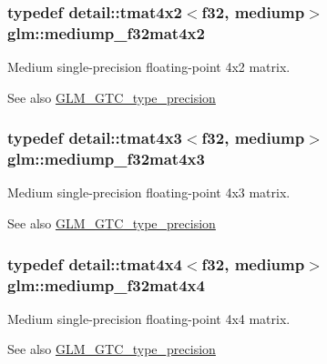 \subsubsection[{\texorpdfstring{mediump\+\_\+f32mat4x2}{mediump_f32mat4x2}}]{\setlength{\rightskip}{0pt plus 5cm}typedef detail\+::tmat4x2$<$f32, mediump$>$ {\bf glm\+::mediump\+\_\+f32mat4x2}}\hypertarget{group__gtc__type__precision_ga3400d5463f0a58cf3959406aa2b69f72}{}\label{group__gtc__type__precision_ga3400d5463f0a58cf3959406aa2b69f72}
Medium single-\/precision floating-\/point 4x2 matrix. \begin{DoxySeeAlso}{See also}
\hyperlink{group__gtc__type__precision}{G\+L\+M\+\_\+\+G\+T\+C\+\_\+type\+\_\+precision} 
\end{DoxySeeAlso}
\subsubsection[{\texorpdfstring{mediump\+\_\+f32mat4x3}{mediump_f32mat4x3}}]{\setlength{\rightskip}{0pt plus 5cm}typedef detail\+::tmat4x3$<$f32, mediump$>$ {\bf glm\+::mediump\+\_\+f32mat4x3}}\hypertarget{group__gtc__type__precision_ga31635d753ab8a19fdaa80d2b89e90c54}{}\label{group__gtc__type__precision_ga31635d753ab8a19fdaa80d2b89e90c54}
Medium single-\/precision floating-\/point 4x3 matrix. \begin{DoxySeeAlso}{See also}
\hyperlink{group__gtc__type__precision}{G\+L\+M\+\_\+\+G\+T\+C\+\_\+type\+\_\+precision} 
\end{DoxySeeAlso}
\subsubsection[{\texorpdfstring{mediump\+\_\+f32mat4x4}{mediump_f32mat4x4}}]{\setlength{\rightskip}{0pt plus 5cm}typedef detail\+::tmat4x4$<$f32, mediump$>$ {\bf glm\+::mediump\+\_\+f32mat4x4}}\hypertarget{group__gtc__type__precision_ga8f83086fffe71f9cd15e75a1de101ba6}{}\label{group__gtc__type__precision_ga8f83086fffe71f9cd15e75a1de101ba6}
Medium single-\/precision floating-\/point 4x4 matrix. \begin{DoxySeeAlso}{See also}
\hyperlink{group__gtc__type__precision}{G\+L\+M\+\_\+\+G\+T\+C\+\_\+type\+\_\+precision} 
\end{DoxySeeAlso}

